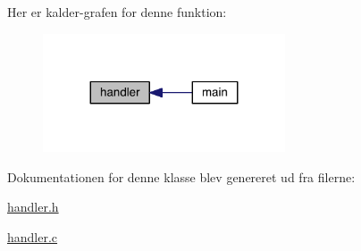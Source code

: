 Her er kalder-\/grafen for denne funktion\+:
\nopagebreak
\begin{figure}[H]
\begin{center}
\leavevmode
\includegraphics[width=203pt]{d2/d01/class_handler_af5be5b016b862943cd22504490acc8f4_icgraph}
\end{center}
\end{figure}




Dokumentationen for denne klasse blev genereret ud fra filerne\+:\begin{DoxyCompactItemize}
\item 
\hyperlink{handler_8h}{handler.\+h}\item 
\hyperlink{handler_8c}{handler.\+c}\end{DoxyCompactItemize}
